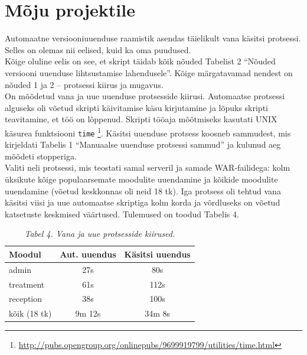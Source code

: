 \documentclass[12pt]{report}
\newcommand{\code}[1]{\texttt{#1}}
\begin{document}
  \newpage
  
  \section{Mõju projektile}
  
  Automaatne versiooniuuenduse raamistik asendas täielikult vana käsitsi protsessi. Selles on olemas nii eelised, kuid ka oma puudused.\\
  
  Kõige oluline eelis on see, et skript täidab kõik nõuded Tabelist 2 ``Nõuded versiooni uuenduse lihtsustamise lahendusele''. Kõige märgatavamad nendest on nõuded 1 ja 2 \--- protsessi kiirus ja mugavus.\\
  
  On mõõdetud vana ja uue uuenduse protsesside kiirusi. Automaatse protsessi alguseks oli võetud skripti käivitamise käsu kirjutamine ja lõpuks skripti teavitamine, et töö on lõppenud. Skripti tööaja mõõtmiseks kasutati UNIX käsurea funktsiooni \code{time} \footnote{\url{http://pubs.opengroup.org/onlinepubs/9699919799/utilities/time.html}}. Käsitsi uuenduse protsess koosneb sammudest, mis kirjeldati Tabelis 1 ``Manuaalse uuenduse protsessi sammud'' ja kulunud aeg mõõdeti stopperiga.\\
  
  Valiti neli protsessi, mis teostati samal serveril ja samade WAR\--failidega: kolm üksikute kõige populaarsemate moodulite uuendamine ja kõikide moodulite uuendamine (võetud keskkonnas oli neid 18 tk). Iga protsess oli tehtud vana käsitsi viisi ja uue automaatse skriptiga kolm korda ja võrdluseks on võetud katsetuste keskmised väärtused. Tulemused on toodud Tabelis 4.
  
  \begin{table}[!htbp]
    \begin{center}
      \caption*{\textit{Tabel 4. Vana ja uue protsesside kiirused.}}
      
      \begin{tabular}{| l | c | c |}
        \hline
         \textbf{Moodul} & \textbf{Aut. uuendus} & \textbf{Käsitsi uuendus}\\
        \hline
        admin & 27s & 80s\\
        treatment & 61s & 112s\\
        reception & 38s & 100s\\
        kõik (18 tk) & 9m 12s & 34m 8s\\
        \hline
      \end{tabular}
    \end{center}
  \end{table}
  
\end{document}

